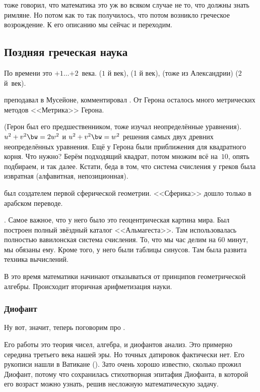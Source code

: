\documentclass[a4paper,oneside,fleqn,10pt]{article}
\newcommand{\pe}[2]{${#1}\ldots{#2}$}
\begin{document}
 тоже говорил, что математика это уж во всяком случае не то, что должны знать римляне.
Но потом как то так получилось, что потом возникло греческое возрождение.
К его описанию мы сейчас и переходим.

\subsection{Поздняя греческая наука}

По времени это \pe{+1}{+2}~века.
 ($1$ й век),  (1 й век),
 (тоже из Александрии) ($2$ й~век).

 преподавал в Мусейоне, комментировал .
От Герона осталось много метрических методов <<Метрика>> Герона.

 (Герон был его предшественником, тоже изучал неопределённые уравнения).
$u^2 + v^2 \bw= 2w^2$ и $u^2 + v^2 \bw= w^2$ решения самых двух древних неопределённых уравнения.
Ещё у Герона были приближения для квадратного корня. Что нужно? Берём подходящий квадрат, потом множим всё на~$10$,
опять подбираем, и так далее. Кстати, беда в том, что система счисления у греков была извратная (алфавитная,
непозиционная).

 был создателем первой сферической геометрии. <<Сферика>> дошло только в арабском переводе.

. Самое важное, что у него было это геоцентрическая картина мира. Был построен полный
звёздный каталог <<Альмагеста>>. Там использовалась полностью вавилонская система счисления.
То, что мы час делим на 60 минут, мы обязаны ему. Кроме того, у него были таблицы синусов.
Там была развита техника вычислений.

В это время математики начинают отказываться от принципов геометрической
алгебры. Происходит вторичная арифметизация науки.

\subsubsection{Диофант}

Ну вот, значит, теперь поговорим про .

Его работы это теория чисел, алгебра, и диофантов анализ. Это примерно середина третьего века нашей эры.
Но точных датировок фактически нет. Его рукописи нашли в Ватикане ().
Зато очень хорошо известно, сколько прожил Диофант, потому что сохранилась
стихотворная эпитафия Диофанта, в которой его возраст можно узнать, решив несложную
математическую задачу.
\end{document}
